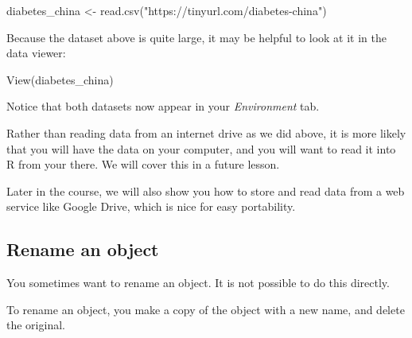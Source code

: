 \documentclass[
  letterpaper,
  DIV=11,
  numbers=noendperiod]{scrreprt}
\newenvironment{Shaded}{\begin{snugshade}}{\end{snugshade}}
\newcommand{\FunctionTok}[1]{\textcolor[rgb]{0.28,0.35,0.67}{#1}}
\newcommand{\NormalTok}[1]{\textcolor[rgb]{0.00,0.23,0.31}{#1}}
\newcommand{\OtherTok}[1]{\textcolor[rgb]{0.00,0.23,0.31}{#1}}
\newcommand{\StringTok}[1]{\textcolor[rgb]{0.13,0.47,0.30}{#1}}
\begin{document}
\begin{Shaded}
\begin{Highlighting}[]
\NormalTok{diabetes\_china }\OtherTok{\textless{}{-}} \FunctionTok{read.csv}\NormalTok{(}\StringTok{"https://tinyurl.com/diabetes{-}china"}\NormalTok{)}
\end{Highlighting}
\end{Shaded}

Because the dataset above is quite large, it may be helpful to look at
it in the data viewer:

\begin{Shaded}
\begin{Highlighting}[]
\FunctionTok{View}\NormalTok{(diabetes\_china)}
\end{Highlighting}
\end{Shaded}

Notice that both datasets now appear in your \emph{Environment} tab.

\begin{tcolorbox}[enhanced jigsaw, colframe=quarto-callout-note-color-frame, rightrule=.15mm, opacityback=0, breakable, coltitle=black, colbacktitle=quarto-callout-note-color!10!white, bottomrule=.15mm, leftrule=.75mm, toprule=.15mm, arc=.35mm, bottomtitle=1mm, colback=white, left=2mm, opacitybacktitle=0.6, titlerule=0mm, title=\textcolor{quarto-callout-note-color}{\faInfo}\hspace{0.5em}{Side Note}, toptitle=1mm]

Rather than reading data from an internet drive as we did above, it is
more likely that you will have the data on your computer, and you will
want to read it into R from your there. We will cover this in a future
lesson.

Later in the course, we will also show you how to store and read data
from a web service like Google Drive, which is nice for easy
portability.

\end{tcolorbox}

\hypertarget{rename-an-object}{%
\subsection{Rename an object}\label{rename-an-object}}

You sometimes want to rename an object. It is not possible to do this
directly.

To rename an object, you make a copy of the object with a new name, and
delete the original.
\end{document}
